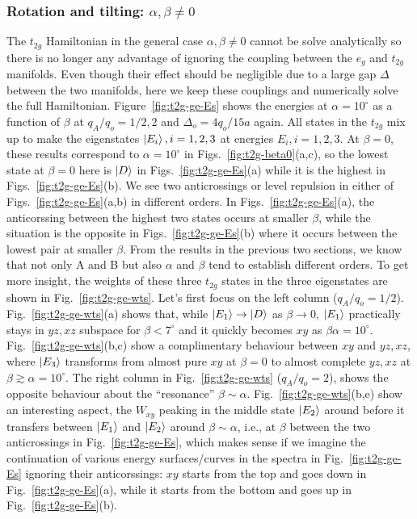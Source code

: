 \documentclass[a4paper,prb,twocolumn]{revtex4-1}  %
\newcommand{\az}[1]{{\color{magenta}{#1}}} %
\begin{document}
\subsubsection{Rotation and tilting: $\alpha,\beta\neq 0$}
\label{sec:t2g-gen}

The $t_{2g}$ Hamiltonian in the general case $\alpha,\beta\neq 0$ cannot be solve analytically
 so there is no longer any advantage of ignoring the coupling between 
 the $e_{g}$ and $t_{2g}$ manifolds.
Even though their effect should be negligible due to a large gap $\Delta$ between the two manifolds,
here we keep these couplings 
and numerically solve
the full Hamiltonian.
Figure~\ref{fig:t2g-ge-Es}
shows the energies at $\alpha=10^\circ$
as a function of $\beta$
at $q_A/q_o=1/2,2$ and $\Delta_o=4q_o/15a$ again.
All states in the $t_{2g}$ mix up to make the eigenstates $\ket{E_i}, i=1,2,3$
at energies $E_i, i=1,2,3$.
\az{E0, can we show E0 only in the first fig and not all of them?}
At $\beta=0$, these results correspond to $\alpha=10^\circ$ 
in Figs.~\ref{fig:t2g-beta0}(a,c),
so the lowest state at $\beta=0$
here is $\ket{D}$ in Figs.~\ref{fig:t2g-ge-Es}(a)
while it is the highest in Figs.~\ref{fig:t2g-ge-Es}(b).
We see two anticrossings or level repulsion in either of Figs.~\ref{fig:t2g-ge-Es}(a,b)
in different orders.
In Figs.~\ref{fig:t2g-ge-Es}(a), 
the anticorssing between the highest two states occurs at smaller $\beta$,
while the situation is the opposite in Figs.~\ref{fig:t2g-ge-Es}(b) where 
it occurs between the lowest pair at smaller $\beta$.
From the results in the previous two sections,
we know that not only A and B but also $\alpha$ and $\beta$ tend to establish different orders.
To get more insight, the weights of these three $t_{2g}$ states in the three eigenstates 
are shown in Fig.~\ref{fig:t2g-ge-wts}.
Let's first focus on the left column ($q_A/q_o=1/2$). 
Fig.~\ref{fig:t2g-ge-wts}(a)
shows that, while $\ket{E_1}\to \ket{D}$ as $\beta\to 0$,
$\ket{E_1}$ practically stays in $yz,xz$ subspace
for $\beta<7^\circ$ and it quickly becomes $xy$
as $\beta\alpha=10^\circ$.
Fig.~\ref{fig:t2g-ge-wts}(b,c)
show a complimentary behaviour 
between $xy$ and $yz,xz$,
where $\ket{E_3}$
transforms from almost pure $xy$ at $\beta=0$
to almost complete $yz,xz$ at $\beta\gtrsim\alpha=10^\circ$.
The right column
in Fig.~\ref{fig:t2g-ge-wts} ($q_A/q_o=2$),
shows the opposite behaviour 
about the ``resonance'' $\beta\sim\alpha$.
Fig.~\ref{fig:t2g-ge-wts}(b,e)
show an interesting aspect,
the $W_{xy}$ peaking in the middle state $\ket{E_2}$
around before it transfers between $\ket{E_1}$ and $\ket{E_2}$
around $\beta\sim\alpha$,
i.e., at $\beta$
between the two anticrossings in 
Fig.~\ref{fig:t2g-ge-Es},
which makes sense if we imagine the continuation of various energy surfaces/curves
in 
the spectra in Fig.~\ref{fig:t2g-ge-Es}
ignoring their anticorssings:
$xy$ starts from the top and goes down in 
Fig.~\ref{fig:t2g-ge-Es}(a),
while it starts from the bottom and goes up
in Fig.~\ref{fig:t2g-ge-Es}(b).
\end{document}

